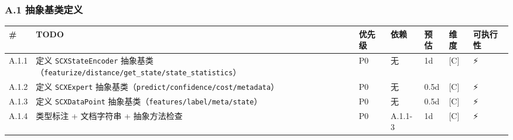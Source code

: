 \documentclass[
  12pt,
]{ctexart}
\begin{document}
\subsubsection{A.1
抽象基类定义}\label{a.1-ux62bdux8c61ux57faux7c7bux5b9aux4e49}

\begin{longtable}[]{@{}
  >{\raggedright\arraybackslash}p{}
  >{\raggedright\arraybackslash}p{}
  >{\raggedright\arraybackslash}p{}
  >{\raggedright\arraybackslash}p{}
  >{\raggedright\arraybackslash}p{}
  >{\raggedright\arraybackslash}p{}
  >{\raggedright\arraybackslash}p{}@{}}
\toprule\noalign{}
\begin{minipage}[b]{\linewidth}\raggedright
\#
\end{minipage} & \begin{minipage}[b]{\linewidth}\raggedright
TODO
\end{minipage} & \begin{minipage}[b]{\linewidth}\raggedright
优先级
\end{minipage} & \begin{minipage}[b]{\linewidth}\raggedright
依赖
\end{minipage} & \begin{minipage}[b]{\linewidth}\raggedright
预估
\end{minipage} & \begin{minipage}[b]{\linewidth}\raggedright
维度
\end{minipage} & \begin{minipage}[b]{\linewidth}\raggedright
可执行性
\end{minipage} \\
\midrule\noalign{}
\endhead
\bottomrule\noalign{}
\endlastfoot
A.1.1 & 定义 \texttt{SCXStateEncoder}
抽象基类（\texttt{featurize/distance/get\_state/state\_statistics}） &
P0 & 无 & 1d & {[}C{]} & ⚡ \\
A.1.2 & 定义 \texttt{SCXExpert}
抽象基类（\texttt{predict/confidence/cost/metadata}） & P0 & 无 & 0.5d &
{[}C{]} & ⚡ \\
A.1.3 & 定义 \texttt{SCXDataPoint}
抽象基类（\texttt{features/label/meta/state}） & P0 & 无 & 0.5d &
{[}C{]} & ⚡ \\
A.1.4 & 类型标注 + 文档字符串 + 抽象方法检查 & P0 & A.1.1-3 & 1d &
{[}C{]} & ⚡ \\
\end{longtable}
\end{document}
